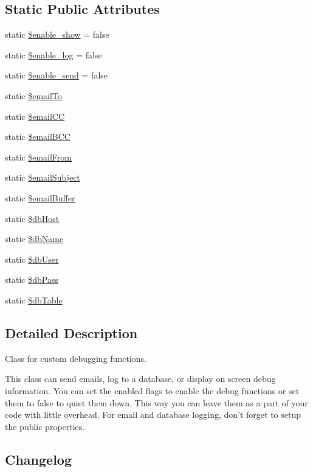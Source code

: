 \subsection*{Static Public Attributes}
\begin{DoxyCompactItemize}
\item 
static \hyperlink{class_debug_a5789d2d16b0d24dc6aa96b63b4f6f605}{\$enable\-\_\-show} = false
\item 
static \hyperlink{class_debug_abf6da1366fe6b13a73e55c0962433b5f}{\$enable\-\_\-log} = false
\item 
static \hyperlink{class_debug_aeb64a58109ab72544114d51e42a3ca4f}{\$enable\-\_\-send} = false
\item 
static \hyperlink{class_debug_a2dca3002fa879522effbe7bd729d681d}{\$email\-To}
\item 
static \hyperlink{class_debug_aef55490ba633a1821bc784c7c5e5a5e5}{\$email\-C\-C}
\item 
static \hyperlink{class_debug_ace2c8fd77a23d56cfdc35a142df1b1ab}{\$email\-B\-C\-C}
\item 
static \hyperlink{class_debug_a8812e953c70aa15f8f01e0a83230e645}{\$email\-From}
\item 
static \hyperlink{class_debug_afc4243e1cc62688011c169b622433f64}{\$email\-Subject}
\item 
static \hyperlink{class_debug_a6da5505f5274a47a70fb0cbac5eef25e}{\$email\-Buffer}
\item 
static \hyperlink{class_debug_ad0ddb2725e69c88a729e0cc242a1b2a6}{\$db\-Host}
\item 
static \hyperlink{class_debug_a68f39949e76b64662a06cb56579d91c3}{\$db\-Name}
\item 
static \hyperlink{class_debug_a4a92606de85aafdc0dcae4976b7ca669}{\$db\-User}
\item 
static \hyperlink{class_debug_a30d808caf55f524798c6a5aaafd633ad}{\$db\-Pass}
\item 
static \hyperlink{class_debug_adfd23e5286c56c7632ecb55887dd2555}{\$db\-Table}
\end{DoxyCompactItemize}


\subsection{Detailed Description}
Class for custom debugging functions.

This class can send emails, log to a database, or display on screen debug information. You can set the enabled flags to enable the debug functions or set them to false to quiet them down. This way you can leave them as a part of your code with little overhead. For email and database logging, don't forget to setup the public properties.\hypertarget{template1_changelog}{}\subsection{Changelog}\label{template1_changelog}

